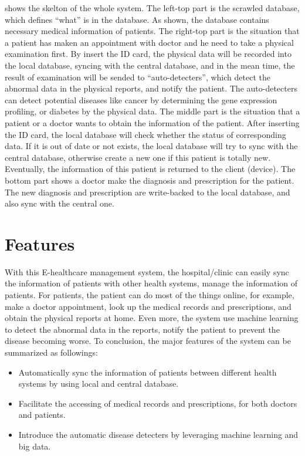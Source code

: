 \documentclass{article}
\begin{document}
   shows the skelton of the whole system. The left-top 
  part is the scrawled database, which defines ``what'' is in the database. 
  As shown, the database contains necessary medical information of patients. 
  The right-top part is the situation that a patient has maken an appointment 
  with doctor and he need to take a physical examination first. By insert the 
  ID card, the physical data will be recorded into the local database, syncing 
  with the central database, and in the mean time, the result of examination 
  will be sended to ``auto-detecters'', which detect the abnormal data in the 
  physical reports, and notify the patient. The auto-detecters can detect 
  potential diseases like cancer by determining the gene expression profiling, 
  or diabetes by the physical data. 
  The middle part is the situation that a patient or a doctor wants to obtain 
  the information of the patient. After inserting the ID card, the local 
  database will check whether the status of corresponding data. If it is out of 
  date or not exists, the local database will try to sync with the central 
  database, otherwise create a new one if this patient is totally new. Eventually, 
  the information of this patient is returned to the client (device). 
  The bottom part shows a doctor make the diagnosis and prescription for the 
  patient. The new diagnosis and prescription are write-backed to the local 
  database, and also sync with the central one. 

\section{Features}
\label{sec:features}

  With this E-healthcare management system, the hospital/clinic can easily 
  sync the information of patients with other health systems, manage 
  the information of patients.
  For patients, the patient can do most of the things online, for example, 
  make a doctor appointment, look up the medical records and prescriptions, 
  and obtain the physical reports at home. Even more, the system use machine 
  learning to detect the abnormal data in the reports, notify the patient 
  to prevent the disease becoming worse. 
  To conclusion, the major features of the system can be summarized as 
  followings: 
  \begin{itemize}
    \item Automatically sync the information of patients between different health systems by using local and central database. 
    \item Facilitate the accessing of medical records and prescriptions, for both doctors and patients. 
    \item Introduce the automatic disease detecters by leveraging machine learning and big data. 
  \end{itemize}
\end{document}
